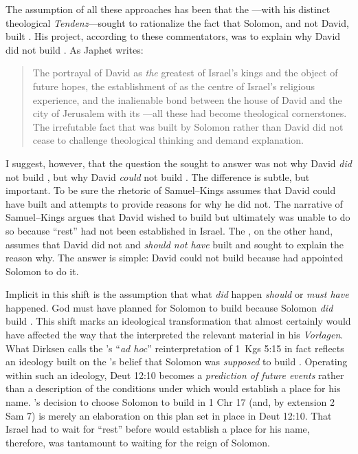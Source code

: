 The assumption of all these approaches has been that the \chronicler---with his distinct theological \emph{Tendenz}---sought to rationalize the fact that Solomon, and not David, built \thetemple. His project, according to these commentators, was to explain why David did not build \thetemple. As Japhet writes:
\begin{quote}
    The portrayal of David as \emph{the} greatest of Israel's kings and the object of future hopes, the establishment of \thetemple as the centre of Israel's religious experience, and the inalienable bond between the house of David and the city of Jerusalem with its \temple---all these had become theological cornerstones. The irrefutable fact that \thetemple was built by Solomon rather than David did not cease to challenge theological thinking and demand explanation.\autocite[396]{japhet1993}
\end{quote}
\noindent
I suggest, however, that the question the \chronicler sought to answer was not why David \emph{did} not build \thetemple, but why David \emph{could} not build \thetemple. The difference is subtle, but important. To be sure the rhetoric of Samuel--Kings assumes that David could have built \thetemple and attempts to provide reasons for why he did not. The narrative of Samuel--Kings argues that David wished to build \thetemple but ultimately  was unable to do so because ``rest'' had not been established in Israel. The \chronicler, on the other hand, assumes that David did not and \emph{should not have} built \thetemple and sought to explain the reason why. The answer is simple: David could not build \thetemple because \yahweh had appointed Solomon to do it. 

Implicit in this shift is the assumption that what \emph{did} happen
\emph{should} or \emph{must have} happened. God must have planned for Solomon to build \thetemple because Solomon \emph{did} build \thetemple. This shift marks an ideological transformation that almost certainly would have affected the way that the \chronicler interpreted the relevant material in his \emph{Vorlagen}. What Dirksen calls the \chronicler's ``\emph{ad hoc}'' reinterpretation of 1~Kgs 5:15 in fact reflects an ideology built on the \chronicler's belief that Solomon was \emph{supposed} to build \thetemple. Operating within such an ideology, Deut 12:10 becomes a \emph{prediction of future events} rather than a description of the conditions under which \yahweh would establish a place for his name. \yahweh's decision to choose Solomon to build \thetemple in 1 Chr 17 (and, by extension 2 Sam 7) is merely an elaboration on this plan set in place in Deut 12:10. That Israel had to wait for ``rest'' before \yahweh would establish a place for his name, therefore, was tantamount to waiting for the reign of Solomon. 

